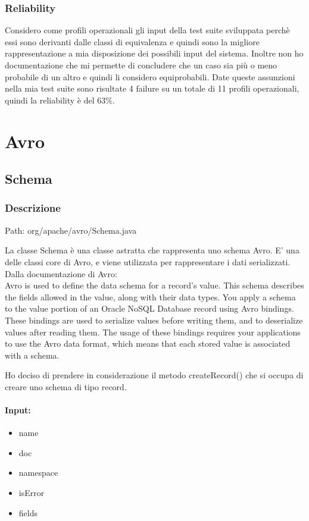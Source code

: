 \documentclass[12pt, a4paper]{article}
\begin{document}
\subsubsection{Reliability}
Considero come profili operazionali gli input della test suite sviluppata perchè essi sono derivanti dalle classi di equivalenza
e quindi sono la migliore rappresentazione a mia disposizione dei possibili input del sistema. Inoltre non ho documentazione che
mi permette di concludere che un caso sia più o meno probabile di un altro e quindi li considero equiprobabili. Date queste 
assunzioni nella mia test suite sono risultate 4 failure su un totale di 11 profili operazionali, quindi la reliability è del 63\%.


\section{Avro}
\subsection{Schema}
\subsubsection{Descrizione}
Path: org/apache/avro/Schema.java

La classe Schema è una classe astratta che rappresenta uno schema Avro. E' una delle classi core di Avro, e viene utilizzata
per rappresentare i dati serializzati. \\

Dalla documentazione di Avro: \\

Avro is used to define the data schema for a record's value. 
This schema describes the fields allowed in the value, along with their data types.
You apply a schema to the value portion of an Oracle NoSQL Database record using Avro bindings.
These bindings are used to serialize values before writing them, and to deserialize values after reading them.
The usage of these bindings requires your applications to use the Avro data format, which means that each
stored value is associated with a schema. 

Ho deciso di prendere in considerazione il metodo createRecord() che si occupa di creare uno schema di tipo record.
\paragraph{Input:}
\begin{itemize}
  \item name
  \item doc
  \item namespace
  \item isError
  \item fields
\end{itemize}
\end{document}
